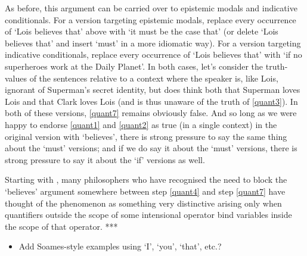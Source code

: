 \documentclass[If.tex]{subfiles}
\begin{document}
As before, this argument can be carried over to epistemic modals and indicative conditionals.  For a version targeting epistemic modals, replace every occurrence of ‘Lois believes that’ above with ‘it must be the case that’ (or delete ‘Lois believes that’ and insert ‘must’ in a more idiomatic way).  For a version targeting indicative conditionals, replace every occurrence of ‘Lois believes that’ with ‘if no superheroes work at the Daily Planet’.  In both cases, let's consider the truth-values of the sentences relative to a context where the speaker is, like Lois, ignorant of Superman's secret identity, but does think both that Superman loves Lois and that Clark loves Lois (and is thus unaware of the truth of \ref{quant3}).  In both of these versions, \ref{quant7} remains obviously false.  And so long as we were happy to endorse \ref{quant1} and \ref{quant2} as true (in a single context) in the original version with ‘believes’, there is strong pressure to say the same thing about the ‘must’ versions; and if we do say it about the ‘must’ versions, there is strong pressure to say it about the ‘if’ versions as well.  

Starting with \citet{KaplanQI}, many philosophers who have recognised the need to block the ‘believes’ argument somewhere between step \ref{quant4} and step \ref{quant7} have thought of the phenomenon as something very distinctive arising only when quantifiers outside the scope of some intensional operator bind variables inside the scope of that operator.  *** 

\begin{itemize}
	\item
	Add Soames-style examples using ‘I’, ‘you’, ‘that’, etc.?  
\end{itemize}


	
	
\end{document}
